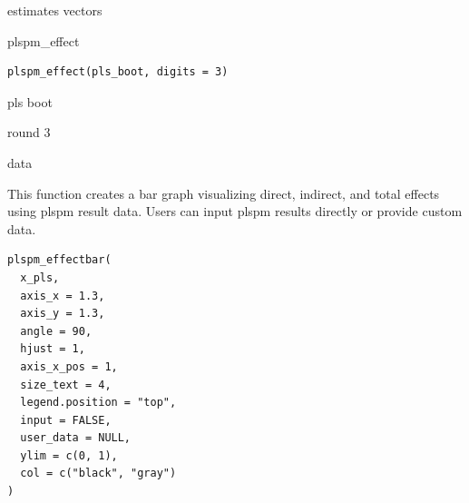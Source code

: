 \documentclass[a4paper]{book}
\begin{document}
%
\begin{Value}
estimates vectors
\end{Value}
%
\begin{Description}
plspm\_effect
\end{Description}
%
\begin{Usage}
\begin{verbatim}
plspm_effect(pls_boot, digits = 3)
\end{verbatim}
\end{Usage}
%
\begin{Arguments}
\begin{ldescription}
\item[\code{pls\_boot}] pls boot

\item[\code{digits}] round 3
\end{ldescription}
\end{Arguments}
%
\begin{Value}
data
\end{Value}
%
\begin{Description}
This function creates a bar graph visualizing direct, indirect, and total effects
using plspm result data. Users can input plspm results directly or provide custom data.
\end{Description}
%
\begin{Usage}
\begin{verbatim}
plspm_effectbar(
  x_pls,
  axis_x = 1.3,
  axis_y = 1.3,
  angle = 90,
  hjust = 1,
  axis_x_pos = 1,
  size_text = 4,
  legend.position = "top",
  input = FALSE,
  user_data = NULL,
  ylim = c(0, 1),
  col = c("black", "gray")
)
\end{verbatim}
\end{Usage}
%
\end{document}
